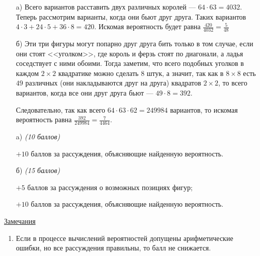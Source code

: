\solutionSection
\begin{enumerate}

    \item[a)] Всего вариантов расставить двух различных королей ---
	$64 \cdot 63 = 4032$. Теперь рассмотрим варианты, когда они бьют друг друга.
	Таких вариантов \linebreak $4 \cdot 3 + 24 \cdot 5 + 36 \cdot 8 = 420$.
	Искомая вероятность будет равна $\frac{420}{4032} = \frac{5}{48}$
	
	\item[б)] Эти три фигуры могут попарно друг друга бить только в том случае, 
	если они стоят <<уголком>>, где король и ферзь стоят по диагонали, а 
	ладья соседствует с ними обоими. Тогда заметим, что всего подобных уголков 
	в каждом $2 \times 2$ квадратике можно сделать $8$ штук, а значит, так как
	в $8 \times 8$ есть $49$ различных (они накладываются друг на друга) квадратов
	$2 \times 2$, то всего вариантов, когда все они друг друга бьют --- $49 \cdot 8 = 392$.
	
	Следовательно, так как всего $64 \cdot 63 \cdot 62 = 249984$ вариантов, то
    искомая вероятность равна $\frac{392}{249984} = \frac{7}{4464}$.
    
\end{enumerate}


\additionalCriteria

\begin{enumerate}
		
	\item[a)] \textit{(10 баллов)}

	$+10$ баллов за рассуждения, объясняющие найденную вероятность.	
	
	\item[б)] \textit{(15 баллов)}
	
	$+5$ баллов за рассуждения о возможных позициях фигур;
	
	$+10$ баллов за рассуждения, объясняющие найденную вероятность.

\end{enumerate}

\underline{Замечания} 
\begin{enumerate}
	\item Если в процессе вычислений вероятностей допущены арифметические ошибки,
	но все рассуждения правильны, то балл не снижается.
\end{enumerate}